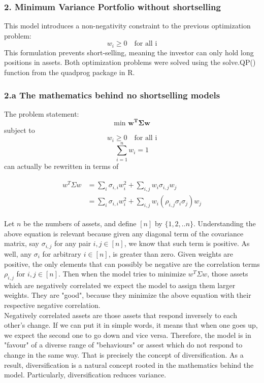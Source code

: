 \documentclass[11pt]{article}
\begin{document}
\subsubsection*{2. Minimum Variance Portfolio without shortselling}
This model introduces a non-negativity constraint to the previous optimization problem:
\[w_i \geq 0 \quad \text{for all i}\]
This formulation prevents short-selling, meaning the investor can only hold long positions in assets.\newline
Both optimization problems were solved using the solve.QP() function from the quadprog package in R.

\subsubsection*{2.a The mathematics behind no shortselling models}
The problem statement:
\[\text{min } \mathbf{w^T\Sigma w}\]
subject to 
\[w_i \geq 0 \quad \text{for all i}\]
\[\sum_{i=1}^n w_i=1\]
can actually be rewritten in terms of 

\begin{align*}
\begin{split}
w^T \Sigma w 
&= \sum_{i} {\sigma_{i,i} w_i^2} + \sum_{i,j} {w_i \sigma_{i,j} w_j} \\
&= \sum_{i} {\sigma_{i,i} w_i^2} + \sum_{i,j} {w_i \left (\rho_{i,j}  \sigma_i  \sigma_j \right) w_j}
\end{split}
\end{align*}

Let $n$ be the numbers of assets, and define $[n]$ by $\{1,2,..n\}$.
Understanding the above equation is relevant because given any diagonal term of the covariance matrix, say $\sigma_{i,j}$ for any pair ${i,j} \in[n]$, we know that such term is positive. As well, any $\sigma_{i}$ for arbitrary ${i} \in[n]$, is greater than zero. Given weights are positive, the only elements that can possibly be negative are the correlation terms $\rho_{i,j}$ for ${i,j} \in[n]$. Then when the model tries to minimize $w^T \Sigma w $, those assets which are negatively correlated we expect the model to assign them larger weights. They are "good", because they minimize the above equation with their respective negative correlation.\\

Negatively correlated assets are those assets that respond inversely to each other's change. If we can put it in simple words, it means that when one goes up, we expect the second one to go down and vice versa. Therefore, the model is in "favour" of a diverse range of "behaviours" or assest which do not respond to change in the same way. That is precisely the concept of diversification. As a result, diversification is a natural concept rooted in the mathematics behind the model. Particularly, diversification reduces variance.
\end{document}
